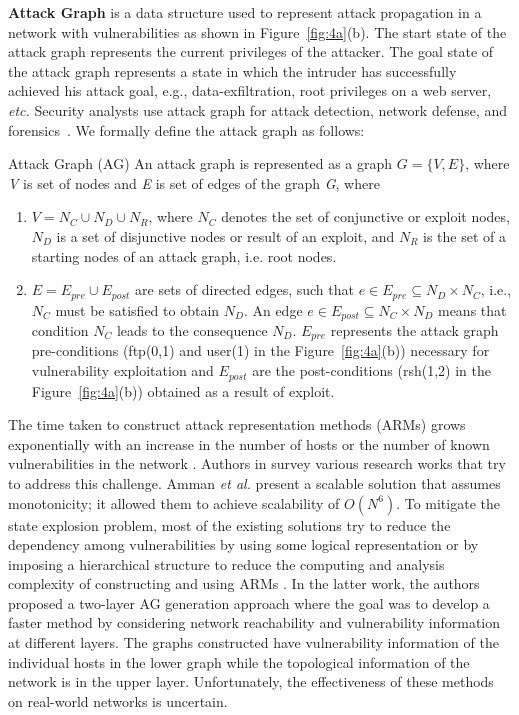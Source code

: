 \textbf{Attack Graph} is a data structure used to represent attack propagation in a network with vulnerabilities as shown in Figure~\ref{fig:4a}(b). The start state of the attack graph represents the current privileges of the attacker. The goal state of the attack graph represents a state in which the intruder has successfully achieved his attack goal, e.g., data-exfiltration, root privileges on a web server, {\em etc.} Security analysts use attack graph for attack detection, network defense, and forensics~. We formally define the attack graph as follows:
\theoremstyle{definition} 
\begin{definition}\label{definition:AG} Attack Graph (AG)
An attack graph is represented as a graph $G=\{V,E\}$, where \textit{V} is set of nodes and \textit{E} is set of edges of the graph \textit{G}, where 
\begin{enumerate}
    \item $V=N_C \cup N_D \cup N_R$, where $N_C$ denotes the set of conjunctive or exploit nodes, $N_D$ is a set of disjunctive nodes or result of an exploit, and $N_R$ is the set of a starting nodes of an attack graph, i.e. root nodes.
    \item  $E=E_{pre} \cup E_{post}$ are sets of directed edges, such that $e \in E_{pre} \subseteq N_D \times N_C$, i.e., $N_C$ must be satisfied to obtain $N_D$. An edge $e \in E_{post} \subseteq N_C \times N_D$ means that condition $N_C$ leads to the consequence $N_D$. $E_{pre}$ represents the attack graph pre-conditions (ftp(0,1) and user(1) in the Figure~\ref{fig:4a}(b)) necessary for vulnerability exploitation and $E_{post}$ are the post-conditions (rsh(1,2) in the Figure~\ref{fig:4a}(b)) obtained as a result of exploit. 
\end{enumerate}
\end{definition}
The time taken to construct attack representation methods (ARMs) grows exponentially with an increase in the number of hosts or the number of known vulnerabilities in the network . Authors in  survey various research works that try to address this challenge. Amman \textit{et al.}  present a scalable solution that assumes monotonicity; it allowed them to achieve scalability of $O(N^6)$.
To mitigate the state explosion problem, most of the existing solutions try to reduce the dependency among vulnerabilities by using some logical representation  or by imposing a hierarchical structure to reduce the computing and analysis complexity of constructing and using ARMs . 
In the latter work, the authors proposed a two-layer AG generation approach where the goal was to develop a faster method by considering network reachability and vulnerability information at different layers. The graphs constructed have vulnerability information of the individual hosts in the lower graph while the topological information of the network is in the upper layer. Unfortunately, the effectiveness of these methods on real-world networks is uncertain.
